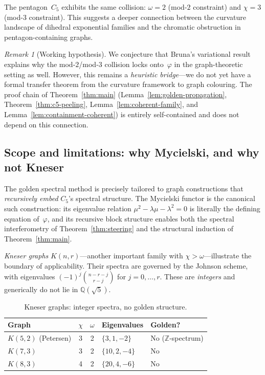 \documentclass[11pt,a4paper]{amsart}
\theoremstyle{plain}
\theoremstyle{definition}
\theoremstyle{remark}
\newtheorem{remark}[theorem]{Remark}
\newcommand{\Z}{\mathbb{Z}}
\newcommand{\Q}{\mathbb{Q}}
\newcommand{\vp}{\varphi}
\newcommand{\chr}{\chi}
\newcommand{\om}{\omega}
\begin{document}
The pentagon~$C_5$ exhibits the same collision: $\om = 2$ (mod-$2$ constraint)
and $\chr = 3$ (mod-$3$ constraint).  This suggests a deeper connection between
the curvature landscape of dihedral exponential families and the chromatic
obstruction in pentagon-containing graphs.

\begin{remark}[Working hypothesis]\label{rem:bruna}
We conjecture that Bruna's variational result explains why the mod-$2$/mod-$3$
collision locks onto~$\vp$ in the graph-theoretic setting as well.  However,
this remains a \emph{heuristic bridge}---we do not yet have a formal transfer
theorem from the curvature framework to graph colouring.  The proof chain of
Theorem~\ref{thm:main}
(Lemma~\ref{lem:golden-propagation}, Theorem~\ref{thm:c5-peeling}, Lemma~\ref{lem:coherent-family}, and Lemma~\ref{lem:containment-coherent})
is entirely self-contained and does not depend on this connection.
\end{remark}

\subsection{Scope and limitations: why Mycielski, and why not Kneser}

The golden spectral method is precisely tailored to graph constructions that
\emph{recursively embed} $C_5$'s spectral structure.  The Mycielski functor is
the canonical such construction: its eigenvalue relation
$\mu^2 - \lambda\mu - \lambda^2 = 0$ is literally the defining equation
of~$\vp$, and its recursive block structure enables both the spectral
interferometry of Theorem~\ref{thm:steering} and the structural induction of
Theorem~\ref{thm:main}.

\emph{Kneser graphs} $K(n,r)$---another important family with
$\chr > \om$---illustrate the boundary of applicability.  Their spectra are
governed by the Johnson scheme, with eigenvalues
$(-1)^j\binom{n-r-j}{r-j}$ for $j = 0,\ldots,r$.  These are \emph{integers}
and generically do not lie in $\Q(\sqrt{5})$.

\begin{table}[ht]
\centering
\caption{Kneser graphs: integer spectra, no golden structure.}
\label{tab:kneser}
\begin{tabular}{lccll}
\toprule
Graph & $\chr$ & $\om$ & Eigenvalues & Golden? \\
\midrule
$K(5,2)$ (Petersen) & 3 & 2 & $\{3,1,-2\}$ & No ($\Z$-spectrum) \\
$K(7,3)$ & 3 & 2 & $\{10,2,-4\}$ & No \\
$K(8,3)$ & 4 & 2 & $\{20,4,-6\}$ & No \\
\bottomrule
\end{tabular}
\end{table}
\end{document}
